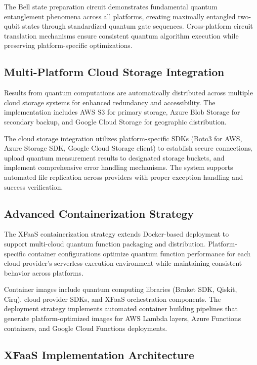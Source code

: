\documentclass[onecolumn]{IEEEtran}
\begin{document}
The Bell state preparation circuit demonstrates fundamental quantum entanglement phenomena across all platforms, creating maximally entangled two-qubit states through standardized quantum gate sequences. Cross-platform circuit translation mechanisms ensure consistent quantum algorithm execution while preserving platform-specific optimizations.

\subsection{Multi-Platform Cloud Storage Integration}

Results from quantum computations are automatically distributed across multiple cloud storage systems for enhanced redundancy and accessibility. The implementation includes AWS S3 for primary storage, Azure Blob Storage for secondary backup, and Google Cloud Storage for geographic distribution.

The cloud storage integration utilizes platform-specific SDKs (Boto3 for AWS, Azure Storage SDK, Google Cloud Storage client) to establish secure connections, upload quantum measurement results to designated storage buckets, and implement comprehensive error handling mechanisms. The system supports automated file replication across providers with proper exception handling and success verification.

\subsection{Advanced Containerization Strategy}

The XFaaS containerization strategy extends Docker-based deployment to support multi-cloud quantum function packaging and distribution. Platform-specific container configurations optimize quantum function performance for each cloud provider's serverless execution environment while maintaining consistent behavior across platforms.

Container images include quantum computing libraries (Braket SDK, Qiskit, Cirq), cloud provider SDKs, and XFaaS orchestration components. The deployment strategy implements automated container building pipelines that generate platform-optimized images for AWS Lambda layers, Azure Functions containers, and Google Cloud Functions deployments.

\subsection{XFaaS Implementation Architecture}
\end{document}
